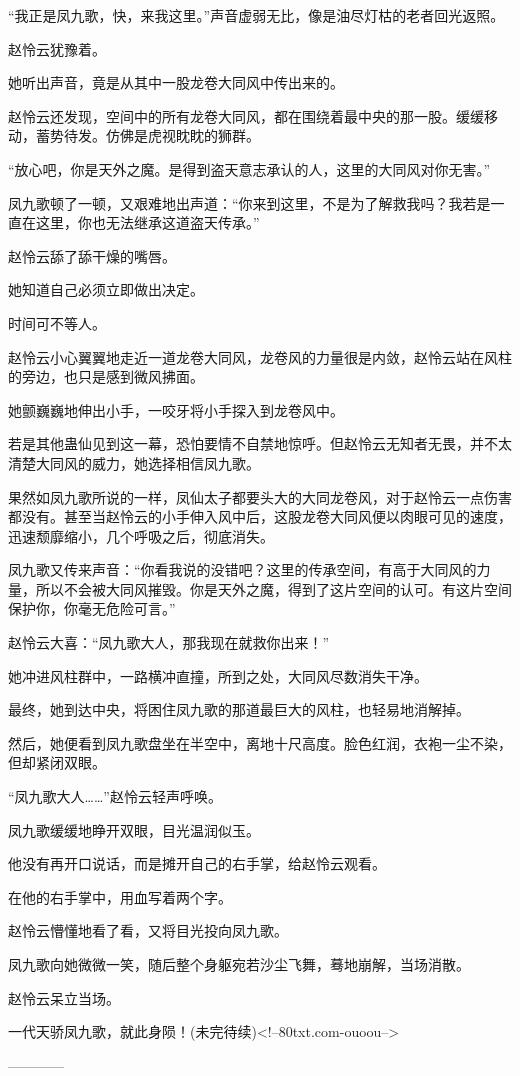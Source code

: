 \begin{this_body}
“我正是凤九歌，快，来我这里。”声音虚弱无比，像是油尽灯枯的老者回光返照。

赵怜云犹豫着。

她听出声音，竟是从其中一股龙卷大同风中传出来的。

赵怜云还发现，空间中的所有龙卷大同风，都在围绕着最中央的那一股。缓缓移动，蓄势待发。仿佛是虎视眈眈的狮群。

“放心吧，你是天外之魔。是得到盗天意志承认的人，这里的大同风对你无害。”

凤九歌顿了一顿，又艰难地出声道：“你来到这里，不是为了解救我吗？我若是一直在这里，你也无法继承这道盗天传承。”

赵怜云舔了舔干燥的嘴唇。

她知道自己必须立即做出决定。

时间可不等人。

赵怜云小心翼翼地走近一道龙卷大同风，龙卷风的力量很是内敛，赵怜云站在风柱的旁边，也只是感到微风拂面。

她颤巍巍地伸出小手，一咬牙将小手探入到龙卷风中。

若是其他蛊仙见到这一幕，恐怕要情不自禁地惊呼。但赵怜云无知者无畏，并不太清楚大同风的威力，她选择相信凤九歌。

果然如凤九歌所说的一样，凤仙太子都要头大的大同龙卷风，对于赵怜云一点伤害都没有。甚至当赵怜云的小手伸入风中后，这股龙卷大同风便以肉眼可见的速度，迅速颓靡缩小，几个呼吸之后，彻底消失。

凤九歌又传来声音：“你看我说的没错吧？这里的传承空间，有高于大同风的力量，所以不会被大同风摧毁。你是天外之魔，得到了这片空间的认可。有这片空间保护你，你毫无危险可言。”

赵怜云大喜：“凤九歌大人，那我现在就救你出来！”

她冲进风柱群中，一路横冲直撞，所到之处，大同风尽数消失干净。

最终，她到达中央，将困住凤九歌的那道最巨大的风柱，也轻易地消解掉。

然后，她便看到凤九歌盘坐在半空中，离地十尺高度。脸色红润，衣袍一尘不染，但却紧闭双眼。

“凤九歌大人……”赵怜云轻声呼唤。

凤九歌缓缓地睁开双眼，目光温润似玉。

他没有再开口说话，而是摊开自己的右手掌，给赵怜云观看。

在他的右手掌中，用血写着两个字。

赵怜云懵懂地看了看，又将目光投向凤九歌。

凤九歌向她微微一笑，随后整个身躯宛若沙尘飞舞，蓦地崩解，当场消散。

赵怜云呆立当场。

一代天骄凤九歌，就此身陨！(未完待续)<!--80txt.com-ouoou-->

------------

\end{this_body}

